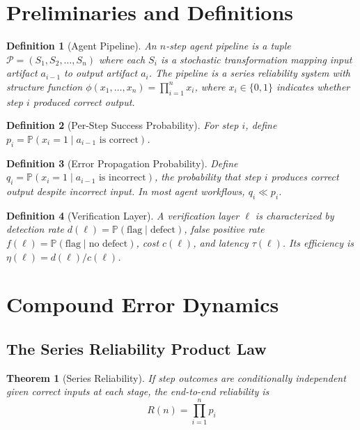 \documentclass[11pt, a4paper, copyright]{googledeepmind}
\newtheorem{definition}{Definition}[section]
\newtheorem{theorem}{Theorem}[section]
\newcommand{\Prob}{\mathbb{P}}
\newcommand{\calP}{\mathcal{P}}
\begin{document}
\section{Preliminaries and Definitions}
\label{sec:prelim}

\begin{definition}[Agent Pipeline]
An \emph{$n$-step agent pipeline} is a tuple $\calP = (S_1, S_2, \ldots, S_n)$ where each $S_i$ is a stochastic transformation mapping input artifact $a_{i-1}$ to output artifact $a_i$.
The pipeline is a \emph{series reliability system} with structure function
$\phi(x_1, \ldots, x_n) = \prod_{i=1}^{n} x_i$,
where $x_i \in \{0,1\}$ indicates whether step $i$ produced correct output.
\end{definition}

\begin{definition}[Per-Step Success Probability]
For step $i$, define $p_i = \Prob(x_i = 1 \mid a_{i-1} \text{ is correct})$.
\end{definition}

\begin{definition}[Error Propagation Probability]
Define $q_i = \Prob(x_i = 1 \mid a_{i-1} \text{ is incorrect})$, the probability that step $i$ produces correct output despite incorrect input.
In most agent workflows, $q_i \ll p_i$.
\end{definition}

\begin{definition}[Verification Layer]
A \emph{verification layer} $\ell$ is characterized by detection rate $d(\ell) = \Prob(\text{flag} \mid \text{defect})$, false positive rate $f(\ell) = \Prob(\text{flag} \mid \text{no defect})$, cost $c(\ell)$, and latency $\tau(\ell)$.
Its \emph{efficiency} is $\eta(\ell) = d(\ell) / c(\ell)$.
\end{definition}

\section{Compound Error Dynamics}
\label{sec:compound}

\subsection{The Series Reliability Product Law}

\begin{theorem}[Series Reliability]
\label{thm:series}
If step outcomes are conditionally independent given correct inputs at each stage, the end-to-end reliability is
\begin{equation}
R(n) = \prod_{i=1}^{n} p_i
\end{equation}
\end{theorem}
\end{document}
